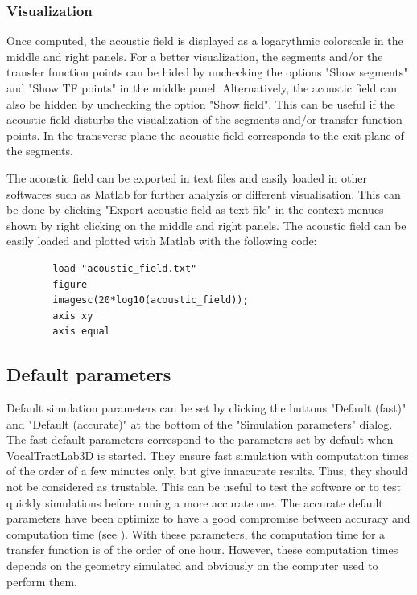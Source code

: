 \documentclass[]{article}
\begin{document}
	\subsubsection{Visualization}
	
	Once computed, the acoustic field is displayed as a logarythmic colorscale in the
	middle and right panels. 
	For a better visualization, the segments and/or the transfer function points can
	be hided by unchecking the options "Show segments" and "Show TF points" in the middle
	panel. 
	Alternatively, the acoustic field can also be hidden by unchecking the option 
	"Show field".
	This can be useful if the acoustic field disturbs the visualization of the segments
	and/or transfer function points.
	In the transverse plane the acoustic field corresponds to the exit plane of the segments.
	
	The acoustic field can be exported in text files and easily loaded in other softwares 
	such as Matlab for further analyzis or different visualisation.
	This can be done by clicking "Export acoustic field as text file" in the context 
	menues shown by right clicking on the middle and right panels.
	The acoustic field can be easily loaded and plotted with Matlab with the following code:
	\begin{lstlisting}
		load "acoustic_field.txt"
		figure
		imagesc(20*log10(acoustic_field));
		axis xy
		axis equal
	\end{lstlisting}
	
	\subsection{Default parameters}
	
	Default simulation parameters can be set by clicking the buttons "Default (fast)" and
	"Default (accurate)" at the bottom of the "Simulation parameters" dialog.
	The fast default parameters correspond to the parameters set by default when 
	VocalTractLab3D is started.
	They ensure fast simulation with computation times of the order of a few minutes only,
	but give innacurate results. 
	Thus, they should not be considered as trustable.
	This can be useful to test the software or to test quickly simulations before runing 
	a more accurate one.
	The accurate default parameters have been optimize to have a good compromise between
	accuracy and computation time (see \textcite{blandin2022efficient}). 
	With these parameters, the computation time for a transfer function is of the order of
	one hour.
	However, these computation times depends on the geometry simulated and obviously on the
	computer used to perform them.
	
\end{document}
